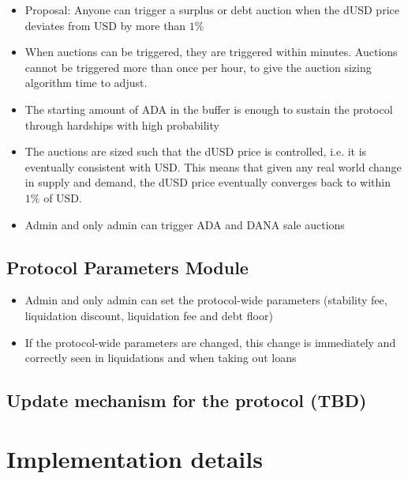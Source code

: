 \documentclass{article} %
\begin{document}
\begin{itemize}
  \item Proposal: Anyone can trigger a surplus or debt auction when the dUSD
    price deviates from USD by more than $1\%$
  \item When auctions can be triggered, they are triggered within minutes.
    Auctions cannot be triggered more than once per hour, to give the auction
    sizing algorithm time to adjust.
  \item The starting amount of ADA in the buffer is enough to sustain the
    protocol through hardships with high probability
  \item The auctions are sized such that the dUSD price is controlled, i.e. it
    is eventually consistent with USD.
    This means that given any real world change in supply and demand, the dUSD
    price eventually converges back to within $1\%$ of USD.
  \item Admin and only admin can trigger ADA and DANA sale auctions
\end{itemize}

\subsection{Protocol Parameters Module}
\begin{itemize}
  \item Admin and only admin can set the protocol-wide parameters (stability
    fee, liquidation discount, liquidation fee and debt
    floor)
  \item If the protocol-wide parameters are changed, this change is immediately
    and correctly seen in liquidations and when taking out loans
\end{itemize}  

\subsection{Update mechanism for the protocol (TBD)}

\section{Implementation details}
\end{document}
